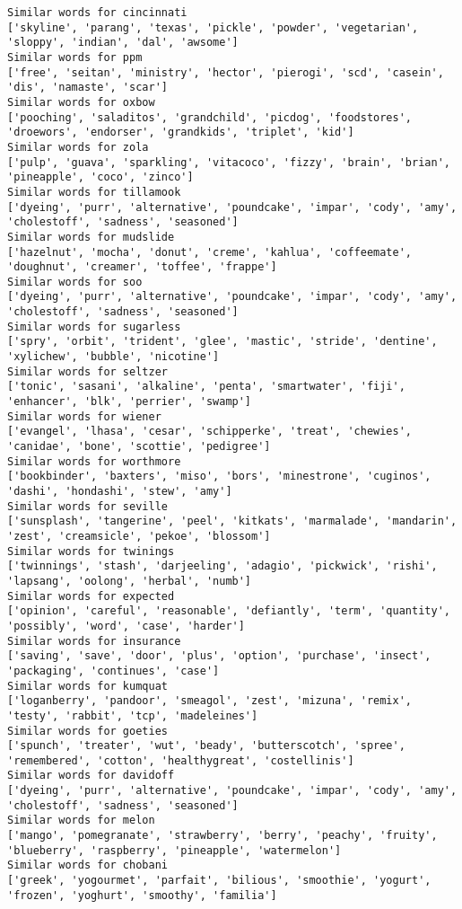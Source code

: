 \documentclass[11pt]{article}
\begin{document}
\begin{Verbatim}[commandchars=\\\{\}]
Similar words for cincinnati
['skyline', 'parang', 'texas', 'pickle', 'powder', 'vegetarian', 'sloppy', 'indian', 'dal', 'awsome']
Similar words for ppm
['free', 'seitan', 'ministry', 'hector', 'pierogi', 'scd', 'casein', 'dis', 'namaste', 'scar']
Similar words for oxbow
['pooching', 'saladitos', 'grandchild', 'picdog', 'foodstores', 'droewors', 'endorser', 'grandkids', 'triplet', 'kid']
Similar words for zola
['pulp', 'guava', 'sparkling', 'vitacoco', 'fizzy', 'brain', 'brian', 'pineapple', 'coco', 'zinco']
Similar words for tillamook
['dyeing', 'purr', 'alternative', 'poundcake', 'impar', 'cody', 'amy', 'cholestoff', 'sadness', 'seasoned']
Similar words for mudslide
['hazelnut', 'mocha', 'donut', 'creme', 'kahlua', 'coffeemate', 'doughnut', 'creamer', 'toffee', 'frappe']
Similar words for soo
['dyeing', 'purr', 'alternative', 'poundcake', 'impar', 'cody', 'amy', 'cholestoff', 'sadness', 'seasoned']
Similar words for sugarless
['spry', 'orbit', 'trident', 'glee', 'mastic', 'stride', 'dentine', 'xylichew', 'bubble', 'nicotine']
Similar words for seltzer
['tonic', 'sasani', 'alkaline', 'penta', 'smartwater', 'fiji', 'enhancer', 'blk', 'perrier', 'swamp']
Similar words for wiener
['evangel', 'lhasa', 'cesar', 'schipperke', 'treat', 'chewies', 'canidae', 'bone', 'scottie', 'pedigree']
Similar words for worthmore
['bookbinder', 'baxters', 'miso', 'bors', 'minestrone', 'cuginos', 'dashi', 'hondashi', 'stew', 'amy']
Similar words for seville
['sunsplash', 'tangerine', 'peel', 'kitkats', 'marmalade', 'mandarin', 'zest', 'creamsicle', 'pekoe', 'blossom']
Similar words for twinings
['twinnings', 'stash', 'darjeeling', 'adagio', 'pickwick', 'rishi', 'lapsang', 'oolong', 'herbal', 'numb']
Similar words for expected
['opinion', 'careful', 'reasonable', 'defiantly', 'term', 'quantity', 'possibly', 'word', 'case', 'harder']
Similar words for insurance
['saving', 'save', 'door', 'plus', 'option', 'purchase', 'insect', 'packaging', 'continues', 'case']
Similar words for kumquat
['loganberry', 'pandoor', 'smeagol', 'zest', 'mizuna', 'remix', 'testy', 'rabbit', 'tcp', 'madeleines']
Similar words for goeties
['spunch', 'treater', 'wut', 'beady', 'butterscotch', 'spree', 'remembered', 'cotton', 'healthygreat', 'costellinis']
Similar words for davidoff
['dyeing', 'purr', 'alternative', 'poundcake', 'impar', 'cody', 'amy', 'cholestoff', 'sadness', 'seasoned']
Similar words for melon
['mango', 'pomegranate', 'strawberry', 'berry', 'peachy', 'fruity', 'blueberry', 'raspberry', 'pineapple', 'watermelon']
Similar words for chobani
['greek', 'yogourmet', 'parfait', 'bilious', 'smoothie', 'yogurt', 'frozen', 'yoghurt', 'smoothy', 'familia']

\end{Verbatim}
\end{document}
